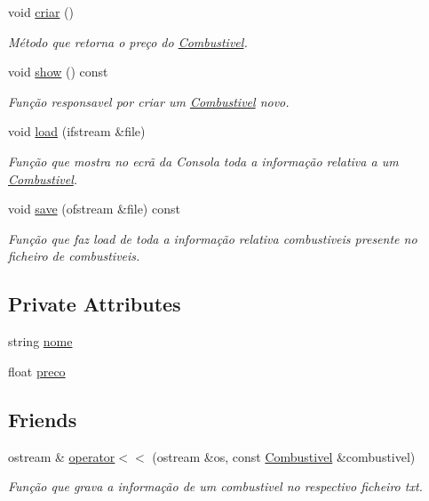 \begin{DoxyCompactItemize}
void \hyperlink{class_combustivel_a4d1c201ebce40ff26f47d289a3c77c5e}{criar} ()
\begin{DoxyCompactList}\small\item\em Método que retorna o preço do \hyperlink{class_combustivel}{Combustivel}. \end{DoxyCompactList}\item 
void \hyperlink{class_combustivel_a1b96054fb39f1a8abadf0dbb3b4e6795}{show} () const 
\begin{DoxyCompactList}\small\item\em Função responsavel por criar um \hyperlink{class_combustivel}{Combustivel} novo. \end{DoxyCompactList}\item 
void \hyperlink{class_combustivel_a8c56fe49436bf236ff3e1f652cee7a00}{load} (ifstream \&file)
\begin{DoxyCompactList}\small\item\em Função que mostra no ecrã da Consola toda a informação relativa a um \hyperlink{class_combustivel}{Combustivel}. \end{DoxyCompactList}\item 
void \hyperlink{class_combustivel_a33e0390d12dc70d302ce0c8a3c4cfb3e}{save} (ofstream \&file) const 
\begin{DoxyCompactList}\small\item\em Função que faz load de toda a informação relativa combustiveis presente no ficheiro de combustiveis. \end{DoxyCompactList}\end{DoxyCompactItemize}
\subsection*{Private Attributes}
\begin{DoxyCompactItemize}
\item 
string \hyperlink{class_combustivel_adfa329c4c4b60abcb87c1f3c82be4145}{nome}
\item 
float \hyperlink{class_combustivel_ac910a8410930ba553861f584da9f48d1}{preco}
\end{DoxyCompactItemize}
\subsection*{Friends}
\begin{DoxyCompactItemize}
\item 
ostream \& \hyperlink{class_combustivel_aa2eefe07fdd78b0fa4dfbb6465cf0075}{operator$<$$<$} (ostream \&os, const \hyperlink{class_combustivel}{Combustivel} \&combustivel)
\begin{DoxyCompactList}\small\item\em Função que grava a informação de um combustivel no respectivo ficheiro txt. \end{DoxyCompactList}\end{DoxyCompactItemize}


